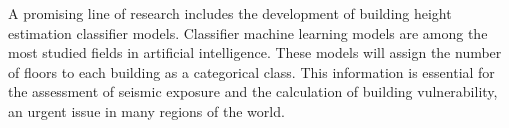 \documentclass[journal,article,submit,pdftex,moreauthors]{Definitions/mdpi}
\begin{document}
A promising line of research includes the development of building height estimation classifier models. Classifier machine learning models are among the most studied fields in artificial intelligence. These models will assign the number of floors to each building as a categorical class. This information is essential for the assessment of seismic exposure and the calculation of building vulnerability, an urgent issue in many regions of the world.  







\vspace{6pt} 


\end{document}
